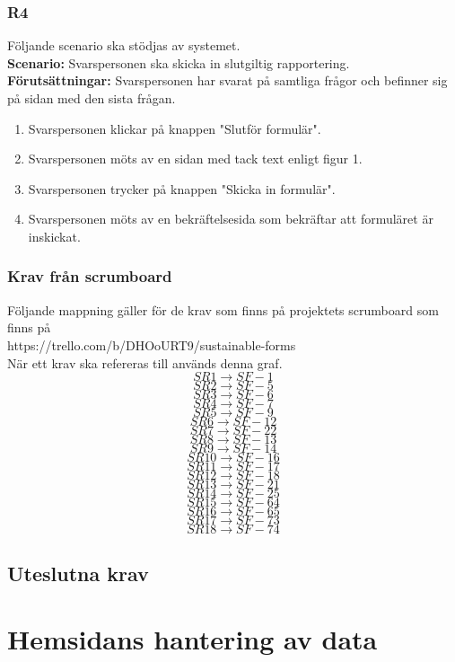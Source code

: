 \documentclass{article}
\begin{document}
        \subsubsection*{R4}
    Följande scenario ska stödjas av systemet.
        \\
       \indent \textbf{Scenario:} Svarspersonen ska skicka in slutgiltig rapportering.
        \\
       \indent \textbf{Förutsättningar:} Svarspersonen har svarat på samtliga frågor och befinner sig på sidan med den sista frågan.
            \begin{enumerate}
                \item Svarspersonen klickar på knappen "Slutför formulär".
                \item Svarspersonen möts av en sidan med tack text enligt figur 1.
                \item Svarspersonen trycker på knappen "Skicka in formulär".
                \item  Svarspersonen möts av en bekräftelsesida som bekräftar att formuläret är inskickat.
            \end{enumerate}

\subsubsection*{Krav från scrumboard}
Följande mappning gäller för de krav som finns på projektets scrumboard som finns på \\
https://trello.com/b/DHOoURT9/sustainable-forms
\\
När ett krav ska refereras till används denna graf.\\
$$SR1\rightarrow SF-1$$
$$SR2\rightarrow SF-5$$
$$SR3\rightarrow SF-6$$
$$SR4\rightarrow SF-7$$
$$SR5\rightarrow SF-9$$
$$SR6\rightarrow SF-12$$
$$SR7\rightarrow SF-22$$
$$SR8\rightarrow SF-13$$
$$SR9\rightarrow SF-14$$
$$SR10\rightarrow SF-16$$
$$SR11\rightarrow SF-17$$
$$SR12\rightarrow SF-18$$
$$SR13\rightarrow SF-21$$
$$SR14\rightarrow SF-25$$
$$SR15\rightarrow SF-64$$
$$SR16\rightarrow SF-65$$
$$SR17\rightarrow SF-73$$
$$SR18\rightarrow SF-74$$

    \subsection*{Uteslutna krav}
    
    \newpage
     \section{Hemsidans hantering av data}
    
\end{document}
